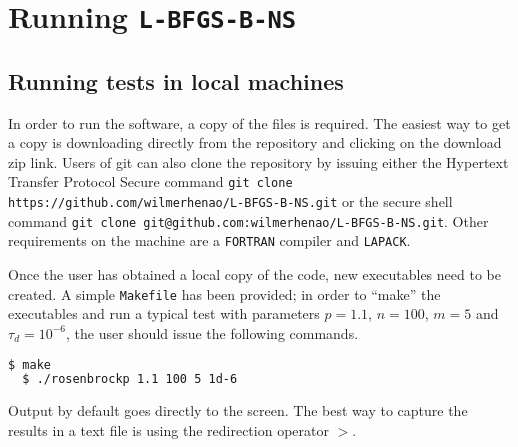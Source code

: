 
\chapter{Running \texttt{L-BFGS-B-NS}} %

\label{AppendixA} %



\section{Running tests in local machines}

In order to run the software, a copy of the files is required. The easiest way to get a copy is downloading directly from the repository \citep{lbfgsbNS} and clicking on the \textup{download zip} link. Users of git can also clone the repository by issuing either the Hypertext Transfer Protocol Secure command \texttt{git clone https://github.com/wilmerhenao/L-BFGS-B-NS.git} or the secure shell command \texttt{git clone git@github.com:wilmerhenao/L-BFGS-B-NS.git}. Other requirements on the machine are a \texttt{FORTRAN} compiler and \texttt{LAPACK}.

Once the user has obtained a local copy of the code, new executables need to be created. A simple \texttt{Makefile} has been provided; in order to ``make'' the executables and run a typical test with parameters $p = 1.1$, $n = 100$, $m = 5$ and $\tau_d = 10^{-6}$, the user should issue the following commands.

\begin{lstlisting}[language=bash]
  $ make
  $ ./rosenbrockp 1.1 100 5 1d-6
\end{lstlisting}

Output by default goes directly to the screen. The best way to capture the results in a text file is using the redirection operator $>$.

